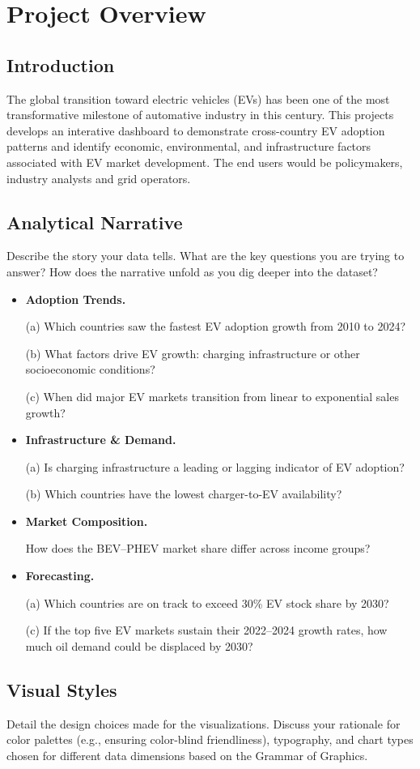 \section{Project Overview}
\subsection{Introduction}
The global transition toward electric vehicles (EVs) has been one of the most transformative milestone of automative industry in this century. This projects develops an interative dashboard to demonstrate cross-country EV adoption patterns and identify economic, environmental, and infrastructure factors associated with EV market development. The end users would be policymakers, industry analysts and grid operators.

\subsection{Analytical Narrative}
Describe the story your data tells. What are the key questions you are trying to answer? How does the narrative unfold as you dig deeper into the dataset? 
\begin{itemize}
    \item \textbf{Adoption Trends.} 
    
    (a) Which countries saw the fastest EV adoption growth from 2010 to 2024?
    
    (b) What factors drive EV growth: charging infrastructure or other socioeconomic conditions?

    (c) When did major EV markets transition from linear to exponential sales growth?

    \item \textbf{Infrastructure \& Demand.} 

    (a) Is charging infrastructure a leading or lagging indicator of EV adoption?

    (b) Which countries have the lowest charger-to-EV availability?
    
    \item \textbf{Market Composition.} 

    How does the BEV–PHEV market share differ across income groups?
    
    \item \textbf{Forecasting.} 

    (a) Which countries are on track to exceed 30\% EV stock share by 2030?

    (c) If the top five EV markets sustain their 2022–2024 growth rates, how much oil demand could be displaced by 2030?

\end{itemize}

\subsection{Visual Styles}
Detail the design choices made for the visualizations. Discuss your rationale for color palettes (e.g., ensuring color-blind friendliness), typography, and chart types chosen for different data dimensions based on the Grammar of Graphics.